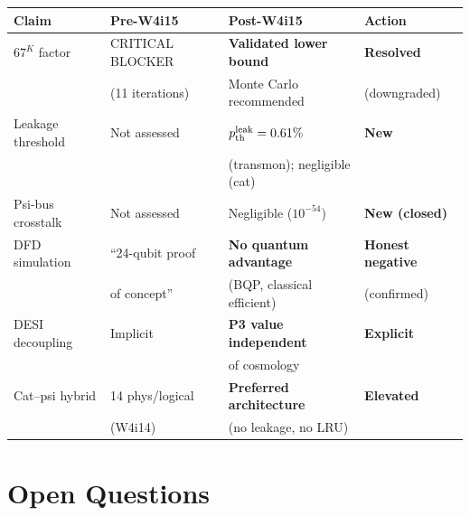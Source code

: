 \documentclass[11pt]{article}
\theoremstyle{definition}
\theoremstyle{remark}
\begin{document}
\begin{center}
\begin{tabular}{@{}llll@{}}
\toprule
Claim & Pre-W4i15 & Post-W4i15 & Action \\
\midrule
$67^K$ factor & CRITICAL BLOCKER & \textbf{Validated lower bound} & \textbf{Resolved} \\
 & (11 iterations) & Monte Carlo recommended & (downgraded) \\
Leakage threshold & Not assessed & $p_{\rm th}^{\rm leak} = 0.61\%$ & \textbf{New} \\
 & & (transmon); negligible (cat) & \\
Psi-bus crosstalk & Not assessed & Negligible ($10^{-54}$) & \textbf{New (closed)} \\
DFD simulation & ``24-qubit proof & \textbf{No quantum advantage} & \textbf{Honest negative} \\
 & of concept'' & (BQP, classical efficient) & (confirmed) \\
DESI decoupling & Implicit & \textbf{P3 value independent} & \textbf{Explicit} \\
 & & of cosmology & \\
Cat--psi hybrid & 14 phys/logical & \textbf{Preferred architecture} & \textbf{Elevated} \\
 & (W4i14) & (no leakage, no LRU) & \\
\bottomrule
\end{tabular}
\end{center}

\section{Open Questions}
\label{sec:open-questions}
\end{document}
